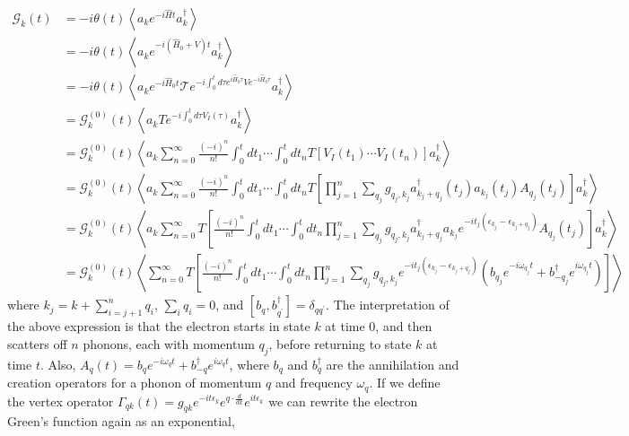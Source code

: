 \begin{align}
\mathcal{G}_k(t)&=-i \theta(t) \left\langle a_k e^{-i\hat{H} t} a_k^\dag\right\rangle \\
&=-i \theta(t) \left\langle a_k e^{-i(\hat{H}_0 + V) t} a_k^\dag\right\rangle \\
&=-i \theta(t) \left\langle a_k e^{-i\hat{H}_0 t} \mathcal{T} e^{-i \int_0^t d \tau e^{i \hat{H}_0 \tau} V e^{-i \hat{H}_0 \tau}} a_k^\dag\right\rangle \\
&=\mathcal{G}_k^{(0)}(t)\left\langle a_k T e^{-i \int_0^t d \tau V_I({\tau})} a_k^\dag\right\rangle \\
&=\mathcal{G}_k^{(0)}(t) \left\langle a_k\sum_{n=0}^{\infty} \frac{(-i)^n}{n!} \int_0^t d t_1 \cdots \int_0^t d t_n T\left[V_I ( t _ { 1 } ) \cdots V_I \left(t_n\right)\right] a_k^\dag\right\rangle \\
&=\mathcal{G}_k^{(0)}(t) \left\langle a_k \sum_{n=0}^{\infty} \frac{(-i)^n}{n!} \int_0^t d t_1 \cdots \int_0^t d t_n T\left[\prod_{j=1}^n \sum_{q_j} g_{q_j, k_j} a_{k_j+q_j}^{\dagger}\left(t_j\right) a_{k_j}\left(t_j\right) A_{q_j}\left(t_j\right)\right] a_k^\dag \right\rangle \\
&=\mathcal{G}_k^{(0)}(t) \left\langle a_k \sum_{n=0}^{\infty} T \left[\frac{(-i)^n}{n!} \int_0^t d t_1 \cdots \int_0^t d t_n \prod_{j=1}^n \sum_{q_j} g_{q_j, k_j} a_{k_j+q_j}^{\dagger} a_{k_j}e^{-it_j(\epsilon_{k_j}-\epsilon_{k_j + q_j})} A_{q_j}\left(t_j\right)\right] a_k^\dag \right\rangle \\
&=\mathcal{G}_k^{(0)}(t) \left\langle \sum_{n=0}^{\infty} T \left[\frac{(-i)^n}{n!} \int_0^t d t_1 \cdots \int_0^t d t_n \prod_{j=1}^n \sum_{q_j} g_{q_j, k_j} e^{-it_j(\epsilon_{k_j}-\epsilon_{k_j + q_j})} \left( b_{q_j} e^{-i \omega_{q_j} t}+b_{-q_j}^\dagger e^{i \omega_{q_j} t}\right)\right] \right\rangle 
\end{align}
where $k_j = k + \sum_{i=j+1}^n q_i$, $\sum_i q_i=0$, and $[b_q, b_{q^{\prime}}^{\dagger}]=\delta_{q q^{\prime}}$. The interpretation of the above expression is that the electron starts in state $k$ at time $0$, and then scatters off $n$ phonons, each with momentum $q_j$, before returning to state $k$ at time $t$. Also, $A_q(t)=b_q e^{-i \omega_q t}+b_{-q}^\dagger e^{i \omega_q t}$, where $b_q$ and $b_q^\dagger$ are the annihilation and creation operators for a phonon of momentum $q$ and frequency $\omega_q$. If we define the vertex operator $\Gamma_{q k}(t)=g_{q k} e^{-i t \epsilon_k} e^{q \cdot \frac{d}{d k}} e^{i t \epsilon_k}$ we can rewrite the electron Green's function again as an exponential,
